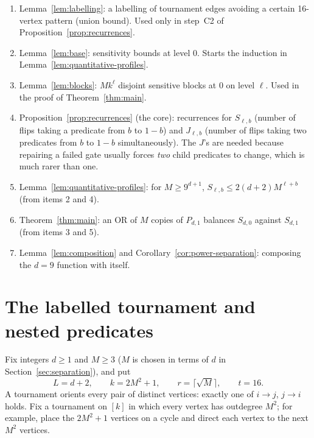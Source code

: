 \documentclass[11pt]{article}
\theoremstyle{definition}
\theoremstyle{remark}
\begin{document}
\begin{enumerate}[leftmargin=*,itemsep=1pt]
\item Lemma~\ref{lem:labelling}: a labelling of tournament edges avoiding a
 certain 16-vertex pattern (union bound). Used only in step~C2 of
 Proposition~\ref{prop:recurrences}.
\item Lemma~\ref{lem:base}: sensitivity bounds at level $0$. Starts the
 induction in Lemma~\ref{lem:quantitative-profiles}.
\item Lemma~\ref{lem:blocks}: $Mk^\ell$ disjoint sensitive blocks at $0$ on
 level $\ell$. Used in the proof of Theorem~\ref{thm:main}.
\item Proposition~\ref{prop:recurrences} (the core): recurrences for
 $S_{\ell,b}$ (number of flips taking a predicate from $b$ to $1-b$) and
 $J_{\ell,b}$ (number of flips taking two predicates from $b$ to $1-b$
 simultaneously). The $J$'s are needed because repairing a failed gate usually
 forces \emph{two} child predicates to change, which is much rarer than one.
\item Lemma~\ref{lem:quantitative-profiles}: for $M\ge9^{d+1}$,
 $S_{\ell,b}\le2(d+2)M^{\ell+b}$ (from items 2 and 4).
\item Theorem~\ref{thm:main}: an OR of $M$ copies of $P_{d,1}$ balances
 $S_{d,0}$ against $S_{d,1}$ (from items 3 and 5).
\item Lemma~\ref{lem:composition} and
 Corollary~\ref{cor:power-separation}: composing the $d=9$ function with
 itself.
\end{enumerate}

\section{The labelled tournament and nested predicates}
\label{sec:construction}

Fix integers \(d\ge1\) and \(M\ge3\) ($M$ is chosen in terms of $d$ in
Section~\ref{sec:separation}), and put
\[
 L=d+2,\qquad k=2M^2+1,\qquad r=\lceil\sqrt M\rceil,\qquad t=16.
\]
A tournament orients every pair of distinct vertices: exactly one of
\(i\to j\), \(j\to i\) holds. Fix a tournament on \([k]\) in which every
vertex has outdegree \(M^2\); for example, place the $2M^2+1$ vertices on a
cycle and direct each vertex to the next \(M^2\) vertices.
\end{document}
